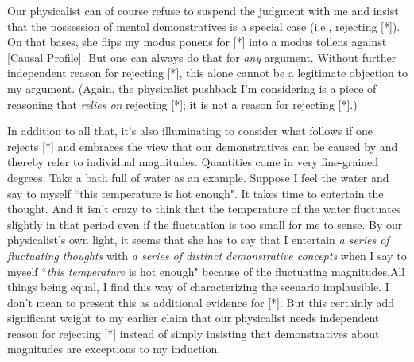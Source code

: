 \documentclass[a4paper,12pt]{article}
\begin{document}
Our physicalist can of course refuse to suspend the judgment with me and insist that the possession of mental demonstratives is a special case (i.e., rejecting [*]). On that bases, she flips my modus ponens for [*] into a modus tollens against [Causal Profile]. But one can always do that for \emph{any} argument. Without further independent reason for rejecting [*], this alone cannot be a legitimate objection to my argument. (Again, the physicalist pushback I'm considering is a piece of reasoning that \emph{relies on} rejecting [*]; it is not a reason for rejecting [*].)

In addition to all that, it's also illuminating to consider what follows if one rejects [*] and embraces the view that our demonstratives can be caused by and thereby refer to individual magnitudes. Quantities come in very fine-grained degrees. Take a bath full of water as an example. Suppose I feel the water and say to myself ``this temperature is hot enough". It takes time to entertain the thought. And it isn't crazy to think that the temperature of the water fluctuates slightly in that period even if the fluctuation is too small for me to sense. By our physicalist's own light, it seems that she has to say that I entertain \emph{a series of fluctuating thoughts} with \emph{a series of distinct demonstrative concepts} when I say to myself ``\emph{this temperature} is hot enough" because of the fluctuating magnitudes.\footnotemark All things being equal, I find this way of characterizing the scenario implausible. I don't mean to present this as additional evidence for [*]. But this certainly add significant weight to my earlier claim that our physicalist needs independent reason for rejecting [*] instead of simply insisting that demonstratives about magnitudes are exceptions to my induction.

\end{document}
